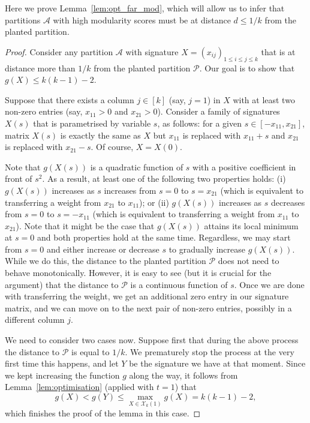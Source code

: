 \documentclass[a4paper,UKenglish,cleveref, autoref, thm-restate,numberwithinsect]{lipics-v2021}
\newcommand{\cA}{\mathcal{A}}
\newcommand{\cP}{\mathcal{P}}
\begin{document}
Here we prove Lemma~\ref{lem:opt_far_mod}, which will allow us to infer that partitions $\cA$ with high modularity scores must be at distance $d\leq 1/k$ from the planted partition. 


\begin{proof}
Consider any partition $\cA$ with signature $X=(x_{ij})_{1\leq i \leq j \leq k}$ that is at distance more than $1/k$ from the planted partition $\cP$. Our goal is to show that $g(X) \le k(k-1)-2$.

Suppose that there exists a column $j \in [k]$ (say, $j=1$) in $X$ with at least two non-zero entries (say, $x_{11}>0$ and $x_{21}>0$). Consider a family of signatures $X(s)$ that is parametrised by variable $s$, as follows: for a given $s \in [-x_{11}, x_{21}]$, matrix $X(s)$ is exactly the same as $X$ but $x_{11}$ is replaced with $x_{11}+s$ and $x_{21}$ is replaced with $x_{21}-s$. Of course, $X = X(0)$.

Note that $g(X(s))$ is a quadratic function of $s$ with a positive coefficient in front of $s^2$. As a result, at least one of the following two properties holds:
(i) $g(X(s))$ increases as $s$ increases from $s=0$ to $s=x_{21}$ (which is equivalent to transferring a weight from $x_{21}$ to $x_{11}$); or
(ii) $g(X(s))$ increases as $s$ decreases from $s=0$ to $s=-x_{11}$ (which is equivalent to transferring a weight from $x_{11}$ to $x_{21}$). 
Note that it might be the case that $g(X(s))$ attains its local minimum at $s=0$ and both properties hold at the same time. 
Regardless, we may start from $s=0$ and either increase or decrease $s$ to gradually increase $g(X(s))$. While we do this, the distance to the planted partition $\cP$ does not need to behave monotonically. However, it is easy to see (but it is crucial for the argument) that the distance to $\cP$ is a continuous function of $s$. Once we are done with transferring the weight, we get an additional zero entry in our signature matrix, and we can move on to the next pair of non-zero entries, possibly in a different column $j$. 

We need to consider two cases now. Suppose first that during the above process the distance to $\cP$ is equal to $1/k$. We prematurely stop the process at the very first time this happens, and let $Y$ be the signature we have at that moment. Since we kept increasing the function $g$ along the way, it follows from Lemma~\ref{lem:optimisation} (applied with $t=1$) that 
$$
g(X) < g(Y) \le \max_{X\in \mathcal{X}_k(1)} g(X) = k(k-1)-2,
$$
which finishes the proof of the lemma in this case. 


\end{proof}
\end{document}
